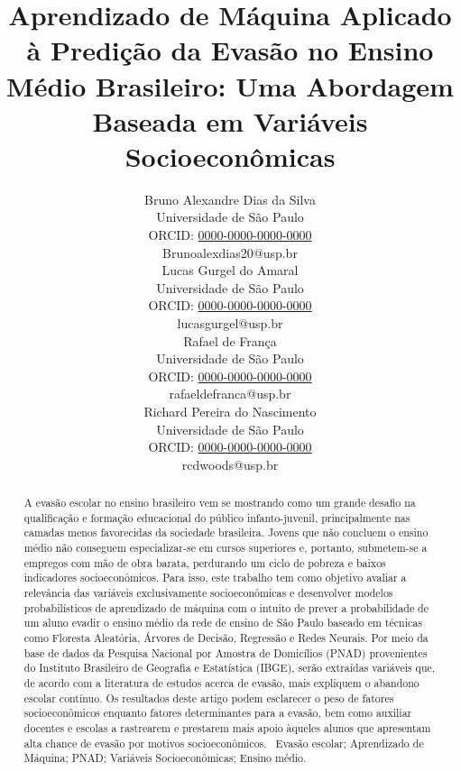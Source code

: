 \documentclass[english, spanish, brazilian]{RBIEarticle} %
\title{Aprendizado de Máquina Aplicado à Predição da Evasão no Ensino Médio Brasileiro: Uma Abordagem Baseada em Variáveis Socioeconômicas}
\author{%
	\parbox{3.8cm}{%
		Bruno Alexandre Dias da Silva\\
		Universidade de São Paulo\\
		ORCID: \href{https://orcid.org/0000-0000-0000-0000}{0000-0000-0000-0000}\\
		Brunoalexdias20@usp.br
	}
        \hspace{0.3cm}
	\parbox{3.8cm}{%
		Lucas Gurgel do Amaral\\
		Universidade de São Paulo\\
		ORCID: \href{https://orcid.org/0000-0000-0000-0000}{0000-0000-0000-0000}\\
		lucasgurgel@usp.br
	}
        \hspace{0.3cm}
        \parbox{3.8cm}{%
		Rafael de França\\
		Universidade de São Paulo\\
		ORCID: \href{https://orcid.org/0000-0000-0000-0000}{0000-0000-0000-0000}\\
		rafaeldefranca@usp.br
	}
        \hspace{0.3cm}
	\parbox{3.9cm}{\raggedright%
		Richard Pereira do Nascimento\\
		Universidade de São Paulo\\
		ORCID: \href{https://orcid.org/0000-0000-0000-0000}{0000-0000-0000-0000}\\
		rcdwoods@usp.br
	}
}
\begin{document}
\maketitle

\begin{otherlanguage}{brazilian}
\begin{abstract}
A evasão escolar no ensino brasileiro vem se mostrando como um grande desafio na qualificação e formação educacional do público infanto-juvenil, principalmente nas camadas menos favorecidas da sociedade brasileira. Jovens que não concluem o ensino médio não conseguem especializar-se em cursos superiores e, portanto, submetem-se a empregos com mão de obra barata, perdurando um ciclo de pobreza e baixos indicadores socioeconômicos. Para isso, este trabalho tem como objetivo avaliar a relevância das variáveis exclusivamente socioeconômicas e desenvolver modelos probabilísticos de aprendizado de máquina com o intuito de prever a probabilidade de um aluno evadir o ensino médio da rede de ensino de São Paulo baseado em técnicas como Floresta Aleatória, Árvores de Decisão, Regressão e Redes Neurais. Por meio da base de dados da Pesquisa Nacional por Amostra de Domicílios (PNAD) provenientes do Instituto Brasileiro de Geografia e Estatística (IBGE), serão extraídas variáveis que, de acordo com a literatura de estudos acerca de evasão, mais expliquem o abandono escolar contínuo. Os resultados deste artigo podem esclarecer o peso de fatores socioeconômicos enquanto fatores determinantes para a evasão, bem como auxiliar docentes e escolas a rastrearem e prestarem mais apoio àqueles alunos que apresentam alta chance de evasão por motivos socioeconômicos.  
\keywords\ Evasão escolar; Aprendizado de Máquina; PNAD; Variáveis Socioeconômicas; Ensino médio.
\end{abstract}
\end{otherlanguage}
\end{document}
